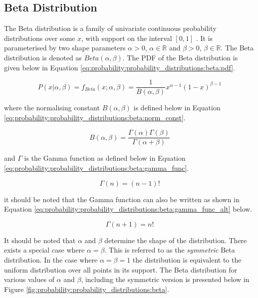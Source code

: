 \subsection{Beta Distribution}
\label{sec:probability:probability_distributions:beta}

The Beta distribution is a family of univariate continuous probability distributions over some $x$, with support on the interval $[0,1]$ \cite{ref:wackerly:2014}. It is parameterised by two shape parameters $\alpha > 0$, $\alpha \in \mathbb{R}$ and $\beta > 0$, $\beta \in \mathbb{R}$. The Beta distribution is denoted as $Beta(\alpha, \beta)$. The \ac{PDF} of the Beta distribution is given below in Equation \ref{eq:probability:probability_distributions:beta:pdf}.

\begin{equation}
    \label{eq:probability:probability_distributions:beta:pdf}
    P(x \vert \alpha, \beta) = f_{Beta}(x; \alpha, \beta) = \frac{1}{B(\alpha, \beta)} x^{\alpha - 1} (1 - x)^{\beta - 1}
\end{equation}

where the normalising constant $B(\alpha, \beta)$ is defined below in Equation \ref{eq:probability:probability_distributions:beta:norm_const}.

\begin{equation}
    \label{eq:probability:probability_distributions:beta:norm_const}
    B(\alpha, \beta) = \frac{\Gamma(\alpha)\Gamma(\beta)}{\Gamma(\alpha + \beta)}
\end{equation}

and $\Gamma$ is the Gamma function as defined below in Equation \ref{eq:probability:probability_distributions:beta:gamma_func}.

\begin{equation}
    \label{eq:probability:probability_distributions:beta:gamma_func}
    \Gamma(n) = ( n - 1)!
\end{equation}

it should be noted that the Gamma function can also be written as shown in Equation \ref{eq:probability:probability_distributions:beta:gamma_func_alt} below.

\begin{equation}
    \label{eq:probability:probability_distributions:beta:gamma_func_alt}
    \Gamma(n+1) = n!
\end{equation}

It should be noted that $\alpha$ and $\beta$ determine the shape of the distribution. There exists a special case where $\alpha = \beta$. This is referred to as the \textit{symmetric} Beta distribution. In the case where $\alpha = \beta = 1$ the distribution is equivalent to the uniform distribution over all points in its support. The Beta distribution for various values of $\alpha$ and $\beta$, including the symmetric version is presented below in Figure \ref{fig:probability:probability_distributions:beta}.

